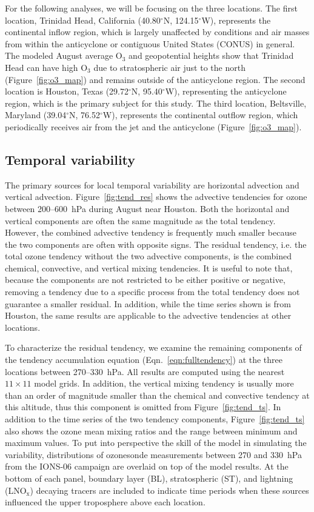 For the following analyses, we will be focusing on the three locations.%
The first location,  Trinidad Head, California (40.80$^\circ$N, 124.15$^\circ$W), represents the
continental inflow region, which is largely unaffected by conditions and air masses from within the
anticyclone or contiguous United States (CONUS) in general. The modeled August average O$_3$ and geopotential heights
show that Trinidad Head can have high O$_3$ due to stratospheric air just to the north
(Figure~\ref{fig:o3_map}) and remains outside of the anticyclone region.
The second location is Houston, Texas (29.72$^\circ$N,
95.40$^\circ$W), representing the anticyclone region, which is the primary subject for this study.
The third location, Beltsville, Maryland (39.04$^\circ$N, 76.52$^\circ$W), represents
the continental outflow region, which periodically receives air from the jet and
the anticyclone (Figure~\ref{fig:o3_map}).

\subsection{Temporal variability}

The primary sources for local temporal variability are horizontal advection and vertical advection.
Figure~\ref{fig:tend_res} shows the advective tendencies for ozone between 200--600~hPa during
August near Houston. Both the horizontal and vertical components are often the same
magnitude as the total tendency. However, the combined advective tendency is frequently much
smaller because the two components are often with opposite signs. The residual
tendency, i.e. the total ozone tendency without the two advective components, is the combined
chemical, convective, and vertical mixing tendencies.
It is useful to note that, because the components are not restricted to be either positive or negative,
removing a tendency due to a specific process from the total tendency does not guarantee a smaller
residual. In addition, while the time series shown is from Houston, the same results are applicable
to the advective tendencies at other locations.

To characterize the residual tendency, we examine the remaining
components of the tendency accumulation equation (Eqn.~\ref{eqn:fulltendency}) at the three
locations between 270--330~hPa. All results are computed using the nearest $11\times11$ model grids.
In addition, the vertical mixing tendency is usually more than an order of magnitude smaller than the
chemical and convective tendency at this altitude, thus this component is omitted from Figure~\ref{fig:tend_ts}.
In addition to the time series of the two tendency components,
Figure~\ref{fig:tend_ts} also shows the ozone mean mixing ratios and the range between minimum and maximum values. To put into
perspective the skill of the model in simulating the variability, distributions of ozonesonde measurements
between 270 and 330~hPa from the IONS-06 campaign \citep{Thompson:2008rp} are
overlaid on top of the model results. At the bottom of each panel, boundary layer (BL), stratospheric
(ST), and lightning (LNO$_{\mathrm{x}}$) decaying tracers are included to indicate time periods
when these sources influenced the upper troposphere above each location.

